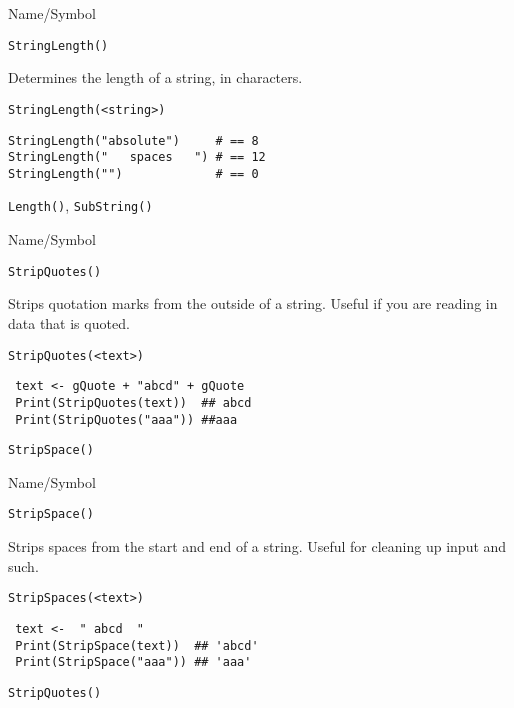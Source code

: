 \begin{desc}{Name/Symbol}
\item[Name/Symbol]  	\verb+StringLength()+

\item[Description] 	Determines the length of a string, in characters.

\item[Usage]
\begin{verbatim}
StringLength(<string>)
\end{verbatim}

\item[Example]     	
\begin{verbatim}
StringLength("absolute")     # == 8
StringLength("   spaces   ") # == 12
StringLength("")             # == 0
\end{verbatim}

\item[See Also]    	\verb+Length()+, \verb+SubString()+
\end{desc}

\rl


\begin{desc}{Name/Symbol}
\item[Name/Symbol]  	\verb+StripQuotes()+

\item[Description] 	Strips quotation marks from the outside of a
  string.  Useful if you are reading in data that is quoted.


\item[Usage]
\begin{verbatim}
StripQuotes(<text>)
\end{verbatim}

\item[Example]     	
\begin{verbatim}
 text <- gQuote + "abcd" + gQuote
 Print(StripQuotes(text))  ## abcd
 Print(StripQuotes("aaa")) ##aaa
\end{verbatim}

\item[See Also]    	\verb+StripSpace()+
\end{desc}

\rl

\begin{desc}{Name/Symbol}
\item[Name/Symbol]  	\verb+StripSpace()+

\item[Description] 	Strips spaces from the start and end of a
  string.  Useful for cleaning up input and such.


\item[Usage]
\begin{verbatim}
StripSpaces(<text>)
\end{verbatim}

\item[Example]     	
\begin{verbatim}
 text <-  " abcd  "
 Print(StripSpace(text))  ## 'abcd'
 Print(StripSpace("aaa")) ## 'aaa'
\end{verbatim}

\item[See Also]    	\verb+StripQuotes()+
\end{desc}

